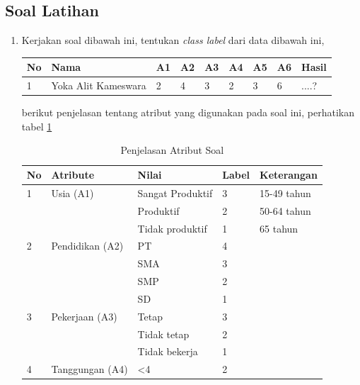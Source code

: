 \subsection{Soal Latihan}
\begin{enumerate}
    \item Kerjakan soal dibawah ini, tentukan \textit{class label} dari data dibawah ini, 
    \begin{table}[!ht]
    \centering
\begin{tabular}{|l|l|l|l|l|l|l|l|l|}
\hline
No & Nama                & A1 & A2 & A3 & A4 & A5 & A6 & Hasil \\ \hline
1  & Yoka Alit Kameswara & 2  & 4  & 3  & 2  & 3  & 6  & ....? \\ \hline
\end{tabular}
\end{table}
berikut penjelasan tentang atribut yang digunakan pada soal ini, perhatikan tabel \ref{soal1}
    \begin{table}[!ht]
    \centering
    \caption{Penjelasan Atribut Soal}
    \label{soal1}
\begin{tabular}{|l|l|l|l|l|}
\hline
No & Atribute                      & Nilai            & Label & Keterangan  \\ \hline
1  & Usia (A1)                     & Sangat Produktif & 3     & 15-49 tahun \\ \hline
   &                               & Produktif        & 2     & 50-64 tahun \\ \hline
   &                               & Tidak produktif  & 1     & 65 tahun    \\ \hline
2  & Pendidikan (A2)               & PT               & 4     &             \\ \hline
   &                               & SMA              & 3     &             \\ \hline
   &                               & SMP              & 2     &             \\ \hline
   &                               & SD               & 1     &             \\ \hline
3  & Pekerjaan (A3)                & Tetap            & 3     &             \\ \hline
   &                               & Tidak tetap      & 2     &             \\ \hline
   &                               & Tidak bekerja    & 1     &             \\ \hline
4  & Tanggungan (A4)               & \textless{}4     & 2     &             \\ \hline

\end{tabular}
\end{table}
\end{enumerate}
